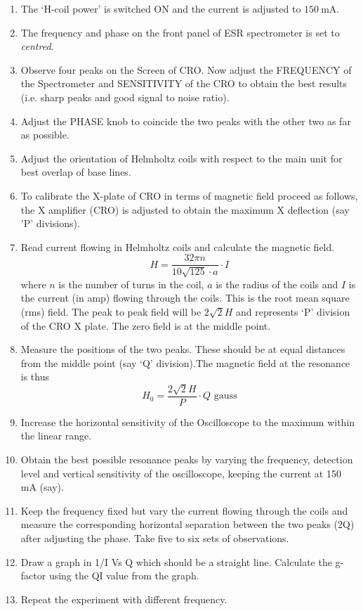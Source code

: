 \documentclass[%
 reprint,
nofootinbib,
 amsmath,amssymb,
 aps,
floatfix,
]{revtex4-2}
\begin{document}
    \begin{enumerate}
        \item The `H-coil power' is switched ON and the current is adjusted to $\SI{150}{\milli \ampere}$.
        \item The frequency and phase on the front panel of ESR spectrometer is set to \textit{centred}.
        \item Observe four peaks on the Screen of CRO. Now adjust the FREQUENCY of the Spectrometer and SENSITIVITY of the CRO to obtain the best results (i.e. sharp peaks and good signal to noise ratio).
        \item Adjust the PHASE knob to coincide the two peaks with the other two as far as possible.
        \item Adjust the orientation of Helmholtz coils with respect to the main unit for best overlap of base lines.
        \item To calibrate the X-plate of CRO in terms of magnetic field proceed as follows, the X amplifier (CRO) is adjusted to obtain the maximum X deflection (say 'P' divisions).
        \item Read current flowing in Helmholtz coils and calculate the magnetic field.
            \begin{equation}
            \label{eqH}
                H = \dfrac{32 \pi n}{10 \sqrt{125} \cdot a} \cdot I
            \end{equation}
        where $n$ is the number of turns in the coil, $a$ is the radius of the coils and $I$ is the current (in amp) flowing through the coils. This is the root mean square (rms) field. The peak to peak field will be $2 \sqrt{2} H$ and represents `P' division of the CRO X plate. The zero field is at the middle point.
        \item Measure the positions of the two peaks. These should be at equal distances from the middle point (say `Q' division).The magnetic field at the resonance is thus
            \begin{equation}
            \label{eqH0}
                H_0 = \dfrac{2 \sqrt{2} H}{P} \cdot Q \text{ gauss}
            \end{equation}
        \item Increase the horizontal sensitivity of the Oscilloscope to the maximum within the linear range.
        \item Obtain the best possible resonance peaks by varying the frequency, detection level and vertical sensitivity of the oscilloscope, keeping the current at 150 mA (say). 
        \item Keep the frequency fixed but vary the current flowing through the coils and measure the corresponding horizontal separation between the two peaks (2Q) after adjusting the phase. Take five to six sets of observations.
        \item Draw a graph in 1/I Vs Q which should be a straight line. Calculate the g-factor using the QI value from the graph.
        \item Repeat the experiment with different frequency. 


    \end{enumerate}
    
\end{document}
